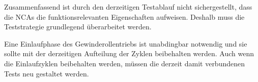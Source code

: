 Zusammenfassend ist durch den derzeitigen Testablauf nicht sichergestellt, dass die NCAs die funktionsrelevanten Eigenschaften aufweisen. Deshalb muss die Teststrategie grundlegend überarbeitet werden.

Eine Einlaufphase des Gewinderollentriebs ist unabdingbar notwendig und sie sollte mit der derzeitigen Aufteilung der Zyklen beibehalten werden. Auch wenn die Einlaufzyklen beibehalten werden, müssen die derzeit damit verbundenen Tests neu gestaltet werden.









